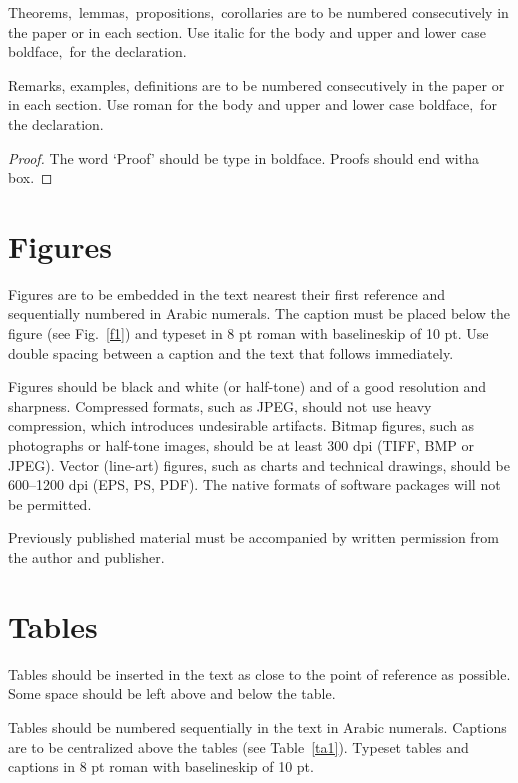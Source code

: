\documentclass{ws-ijmpcs}
\begin{document}
\begin{theorem}
Theorems$,$ lemmas$,$ propositions$,$ corollaries are to be numbered
consecutively in the paper or in each section. Use italic for the
body and upper and lower case boldface$,$ for the declaration.
\end{theorem}

\begin{remark}
Remarks, examples, definitions are to be numbered
consecutively in the paper or in each section. Use roman for the
body and upper and lower case boldface$,$ for the declaration.
\end{remark}

\begin{proof}
The word `Proof' should be type in boldface. Proofs
should end with\break a box.
\end{proof}

\section{Figures}
Figures are to be embedded in the text nearest their first reference
and sequentially numbered in Arabic numerals. The caption must be
placed below the figure (see Fig.~\ref{f1}) and typeset in 8 pt roman with
baselineskip of 10 pt. Use double spacing between a caption and the
text that follows immediately.

Figures should be black and white (or half-tone) and of a good
resolution and sharpness. Compressed formats, such as JPEG, should not
use heavy compression, which introduces undesirable artifacts. Bitmap
figures, such as photographs or half-tone images, should be at least
300 dpi (TIFF, BMP or JPEG). Vector (line-art) figures, such as
charts and technical drawings, should be 600--1200 dpi (EPS, PS,
PDF). The native formats of software packages will not be permitted.

Previously published material must be accompanied by written
permission from the author and publisher.

\section{Tables}
Tables should be inserted in the text as close to the point of
reference as possible. Some space should be left above and below
the table.

Tables should be numbered sequentially in the text in Arabic
numerals. Captions are to be centralized above the tables (see
Table~\ref{ta1}).  Typeset tables and captions in 8 pt roman with
baselineskip of 10 pt.
\end{document}
